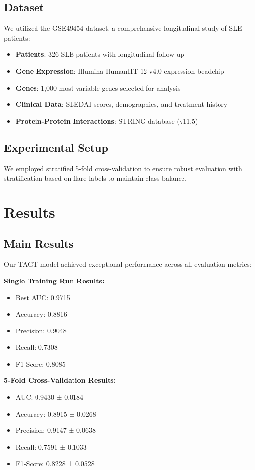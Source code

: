 \documentclass[10pt,twocolumn]{article}
\begin{document}
\subsection{Dataset}

We utilized the GSE49454 dataset, a comprehensive longitudinal study of SLE patients:
\begin{itemize}
\item \textbf{Patients}: 326 SLE patients with longitudinal follow-up
\item \textbf{Gene Expression}: Illumina HumanHT-12 v4.0 expression beadchip
\item \textbf{Genes}: 1,000 most variable genes selected for analysis
\item \textbf{Clinical Data}: SLEDAI scores, demographics, and treatment history
\item \textbf{Protein-Protein Interactions}: STRING database (v11.5)
\end{itemize}

\subsection{Experimental Setup}

We employed stratified 5-fold cross-validation to ensure robust evaluation with stratification based on flare labels to maintain class balance.

\section{Results}

\subsection{Main Results}

Our TAGT model achieved exceptional performance across all evaluation metrics:

\textbf{Single Training Run Results:}
\begin{itemize}
\item Best AUC: 0.9715
\item Accuracy: 0.8816
\item Precision: 0.9048
\item Recall: 0.7308
\item F1-Score: 0.8085
\end{itemize}

\textbf{5-Fold Cross-Validation Results:}
\begin{itemize}
\item AUC: 0.9430 ± 0.0184
\item Accuracy: 0.8915 ± 0.0268
\item Precision: 0.9147 ± 0.0638
\item Recall: 0.7591 ± 0.1033
\item F1-Score: 0.8228 ± 0.0528
\end{itemize}
\end{document}
